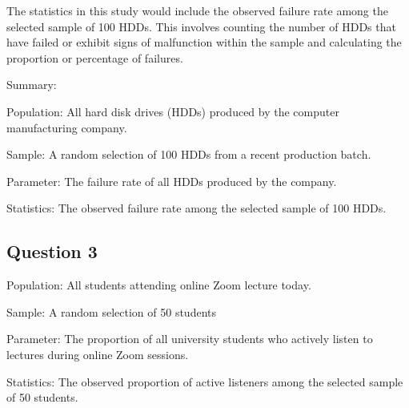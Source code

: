 \documentclass[
]{article}
\begin{document}
The statistics in this study would include the observed failure rate
among the selected sample of 100 HDDs. This involves counting the number
of HDDs that have failed or exhibit signs of malfunction within the
sample and calculating the proportion or percentage of failures.

Summary:

Population: All hard disk drives (HDDs) produced by the computer
manufacturing company.

Sample: A random selection of 100 HDDs from a recent production batch.

Parameter: The failure rate of all HDDs produced by the company.

Statistics: The observed failure rate among the selected sample of 100
HDDs.

\subsection{Question 3}\label{question-3}

Population: All students attending online Zoom lecture today.

Sample: A random selection of 50 students

Parameter: The proportion of all university students who actively listen
to lectures during online Zoom sessions.

Statistics: The observed proportion of active listeners among the
selected sample of 50 students.
\end{document}
